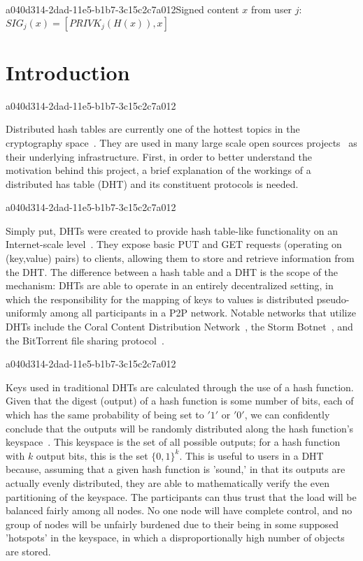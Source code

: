 \documentclass[12pt]{article}
\begin{document}
a040d314-2dad-11e5-b1b7-3c15c2c7a012Signed content $x$ from user $j$: $SIG_j(x) = \left[ PRIVK_j( H(x) ), x \right]$

\section{Introduction}
a040d314-2dad-11e5-b1b7-3c15c2c7a012\par Distributed hash tables are currently one of the hottest topics in the cryptography space~\cite{Stoica:2001dj,Rowstron:2001ea,Ratnasamy:2001wn}. They are used in many large scale open sources projects~\cite{Freitas:2013tb,Xu:2010vs,Perfitt:2010fh} as their underlying infrastructure. First, in order to better understand the motivation behind this project, a brief explanation of the workings of a distributed has table (DHT) and its constituent protocols is needed.

a040d314-2dad-11e5-b1b7-3c15c2c7a012\par Simply put, DHTs were created to provide hash table-like functionality on an Internet-scale level~\cite{Ratnasamy:2001wn}. They expose basic PUT and GET requests (operating on (key,value) pairs) to clients, allowing them to store and retrieve information from the DHT. The difference between a hash table and a DHT is the scope of the mechanism: DHTs are able to operate in an entirely decentralized setting, in which the responsibility for the mapping of keys to values is distributed pseudo-uniformly among all participants in a P2P network. Notable networks that utilize DHTs include the Coral Content Distribution Network~\cite{Freedman:2004vb}, the Storm Botnet~\cite{Holz:2008uk}, and the BitTorrent file sharing protocol~\cite{Cohen:y1_8mBnw}.

a040d314-2dad-11e5-b1b7-3c15c2c7a012\par Keys used in traditional DHTs are calculated through the use of a hash function. Given that the digest (output) of a hash function is some number of bits, each of which has the same probability of being set to $'1'$ or $'0'$, we can confidently conclude that the outputs will be randomly distributed along the hash function's keyspace~. This keyspace is the set of all possible outputs; for a hash function with $k$ output bits, this is the set $\{0,1\}^k$. This is useful to users in a DHT because, assuming that a given hash function is 'sound,' in that its outputs are actually evenly distributed, they are able to mathematically verify the even partitioning of the keyspace. The participants can thus trust that the load will be balanced fairly among all nodes. No one node will have complete control, and no group of nodes will be unfairly burdened due to their being in some supposed 'hotspots' in the keyspace, in which a disproportionally high number of objects are stored.~
\end{document}
